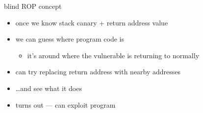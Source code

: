 \begin{frame}{blind ROP concept}
    \begin{itemize}
    \item once we know stack canary + return address value
    \item we can guess where program code is
        \begin{itemize}
        \item it's around where the vulnerable is returning to normally
        \end{itemize}
    \vspace{.5cm}
    \item can try replacing return address with nearby addresses
    \item \ldots and see what it does
    \item turns out --- can exploit program 
    \end{itemize}
\end{frame}
